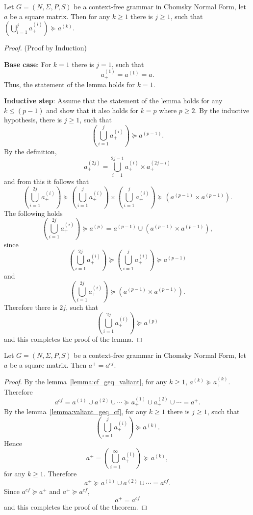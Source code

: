 \begin{lemma}\label{lemma:valiant_geq_cf}
	Let $G =(N,\Sigma,P, S)$ be a context-free grammar in Chomsky Normal Form, let $a$ be a square matrix. Then for any $k \geq 1$ there is $j \geq 1$, such that $(\bigcup^{j}_{i=1}{a^{(i)}_+}) \succeq a^{(k)}$.
\end{lemma}
\begin{proof}(Proof by Induction)
	
	\textbf{Base case}: For $k = 1$ there is $j = 1$, such that $$a^{(1)}_+ = a^{(1)} = a.$$ Thus, the statement of the lemma holds for $k = 1$.
	
	\textbf{Inductive step}: Assume that the statement of the lemma holds for any $k \leq (p - 1)$ and show that it also holds for $k = p$ where $p \geq 2$. By the inductive hypothesis, there is $j \geq 1$, such that $$(\bigcup^{j}_{i=1}{a^{(i)}_+}) \succeq a^{(p-1)}.$$ By the definition, $$a^{(2j)}_+ = \bigcup^{2j-1}_{i=1}{a^{(i)}_+ \times a^{(2j-i)}_+}$$ and from this it follows that $$(\bigcup^{2j}_{i=1}{a^{(i)}_+}) \succeq (\bigcup^{j}_{i=1}{a^{(i)}_+}) \times (\bigcup^{j}_{i=1}{a^{(i)}_+}) \succeq (a^{(p-1)} \times a^{(p-1)}).$$ The following holds $$(\bigcup^{2j}_{i=1}{a^{(i)}_+}) \succeq a^{(p)} = a^{(p-1)} \cup (a^{(p-1)} \times a^{(p-1)}),$$ since $$(\bigcup^{2j}_{i=1}{a^{(i)}_+}) \succeq (\bigcup^{j}_{i=1}{a^{(i)}_+}) \succeq a^{(p-1)}$$ and $$(\bigcup^{2j}_{i=1}{a^{(i)}_+}) \succeq (a^{(p-1)} \times a^{(p-1)}).$$ Therefore there is $2j$, such that $$(\bigcup^{2j}_{i=1}{a^{(i)}_+}) \succeq a^{(p)}$$ and this completes the proof of the lemma.	
\end{proof}

\begin{mytheorem}\label{thm:closures}
	Let $G =(N,\Sigma,P,S)$ be a context-free grammar in Chomsky Normal Form, let $a$ be a square matrix. Then $a^+ = a^{cf}$.
\end{mytheorem}
\begin{proof}
	
	By the lemma~\ref{lemma:cf_geq_valiant}, for any $k \geq 1$, $a^{(k)} \succeq a^{(k)}_+$. Therefore $$a^{cf} = a^{(1)} \cup a^{(2)} \cup \cdots \succeq a^{(1)}_+ \cup a^{(2)}_+ \cup \cdots = a^+.$$ By the lemma~\ref{lemma:valiant_geq_cf}, for any $k \geq 1$ there is $j \geq 1$, such that $$(\bigcup^{j}_{i=1}{a^{(i)}_+}) \succeq a^{(k)}.$$ Hence $$a^+ = (\bigcup^{\infty}_{i=1}{a^{(i)}_+}) \succeq a^{(k)},$$ for any $k \geq 1$. Therefore $$a^+ \succeq a^{(1)} \cup a^{(2)} \cup \cdots = a^{cf}.$$ Since $a^{cf} \succeq a^+$ and $a^+ \succeq a^{cf}$, $$a^+ = a^{cf}$$ and this completes the proof of the theorem.
\end{proof}